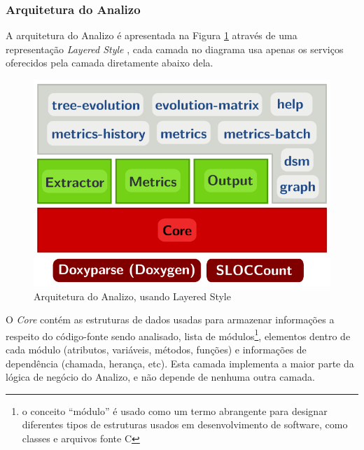 
\subsubsection{Arquitetura do Analizo}

A arquitetura do Analizo é apresentada na Figura \ref{arquitetura-analizo}
através de uma representação {\it Layered Style} \cite{Clements2002}, cada
camada no diagrama usa apenas os serviços oferecidos pela camada diretamente
abaixo dela.

\begin{figure}[h]
\center
\includegraphics[scale=0.3]{imagens/analizo-architecture.png}
\caption{Arquitetura do Analizo, usando Layered Style \cite{Clements2002}}
\label{arquitetura-analizo}
\end{figure}

O {\it Core} contém as estruturas de dados usadas para armazenar informações a
respeito do código-fonte sendo analisado, lista de módulos\footnote{o
conceito ``módulo'' é usado como um termo abrangente para designar diferentes
tipos de estruturas usados em desenvolvimento de software, como classes e
arquivos fonte C}, elementos dentro de cada módulo (atributos, variáveis,
métodos, funções) e informações de dependência (chamada, herança, etc). Esta
camada implementa a maior parte da lógica de negócio do Analizo, e não depende
de nenhuma outra camada.

